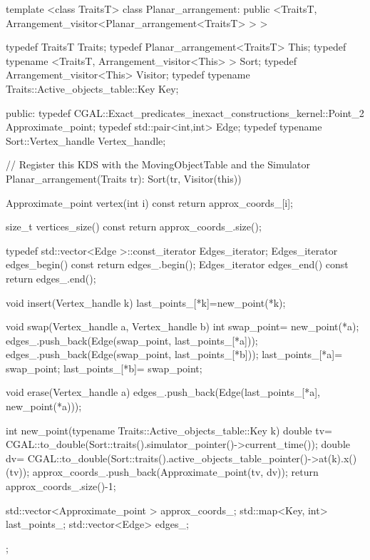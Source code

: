 \begin{ccExampleCode}

template <class TraitsT> 
class Planar_arrangement: 
  public <TraitsT, 
			     Arrangement_visitor<Planar_arrangement<TraitsT> > > {
  typedef TraitsT Traits;
  typedef Planar_arrangement<TraitsT> This;
  typedef typename <TraitsT,
				       Arrangement_visitor<This> > Sort;
  typedef Arrangement_visitor<This> Visitor;
  typedef typename Traits::Active_objects_table::Key Key;

public:
  typedef CGAL::Exact_predicates_inexact_constructions_kernel::Point_2 Approximate_point;
  typedef std::pair<int,int> Edge;
  typedef typename Sort::Vertex_handle Vertex_handle; 

  // Register this KDS with the MovingObjectTable and the Simulator
  Planar_arrangement(Traits tr): Sort(tr, Visitor(this)) {}

  Approximate_point vertex(int i) const
  {
    return approx_coords_[i];
  }

  size_t vertices_size() const
  {
    return approx_coords_.size();
  }

  typedef std::vector<Edge >::const_iterator Edges_iterator;
  Edges_iterator edges_begin() const
  {
    return edges_.begin();
  }
  Edges_iterator edges_end() const
  {
    return edges_.end();
  }

  void insert(Vertex_handle k) {
    last_points_[*k]=new_point(*k);
  }

  void swap(Vertex_handle a, Vertex_handle b) {
    int swap_point= new_point(*a);
    edges_.push_back(Edge(swap_point, last_points_[*a]));
    edges_.push_back(Edge(swap_point, last_points_[*b]));
    last_points_[*a]= swap_point;
    last_points_[*b]= swap_point;
  }

  void erase(Vertex_handle a) {
    edges_.push_back(Edge(last_points_[*a], new_point(*a)));
  }

  int new_point(typename Traits::Active_objects_table::Key k) {
    double tv= CGAL::to_double(Sort::traits().simulator_pointer()->current_time());
    double dv= CGAL::to_double(Sort::traits().active_objects_table_pointer()->at(k).x()(tv));
    approx_coords_.push_back(Approximate_point(tv, dv));
    return approx_coords_.size()-1;
  }

  std::vector<Approximate_point > approx_coords_;
  std::map<Key, int> last_points_;
  std::vector<Edge> edges_;

};
\end{ccExampleCode}

